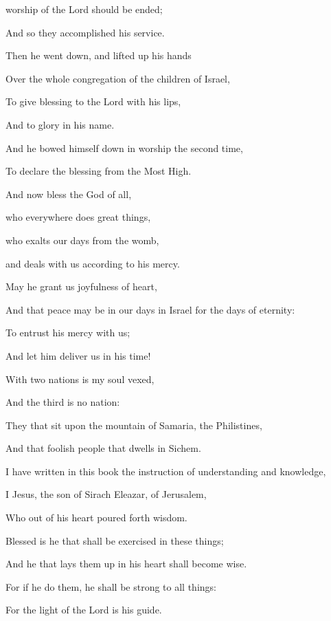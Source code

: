 { worship of the Lord should be ended;
\par }{\Q And so they accomplished his service.
\par }{\Q {}Then he went down, and lifted up his hands
\par }{\Q Over the whole congregation of the children of Israel,
\par }{\Q To give blessing to the Lord with his lips,
\par }{\Q And to glory in his name.
\par }{\Q {}And he bowed himself down in worship the second time,
\par }{\Q To declare the blessing from the Most High.
\par }{\BB \par }{\Q {}And now bless the God of all,
\par }{\QB who everywhere does great things,
\par }{\QB who exalts our days from the womb,
\par }{\QB and deals with us according to his mercy.
\par }{\Q {}May he grant us joyfulness of heart,
\par }{\Q And that peace may be in our days in Israel for the days of eternity:
\par }{\Q {}To entrust his mercy with us;
\par }{\Q And let him deliver us in his time!
\par }{\BB \par }{\Q {}With two nations is my soul vexed,
\par }{\Q And the third is no nation:
\par }{\Q {}They that sit upon the mountain of
 Samaria,
{} the Philistines,
\par }{\Q And that foolish people that dwells in Sichem.
\par }{\BB \par }{\Q {}I have
 written in this book the instruction of understanding and knowledge,
\par }{\Q I Jesus, the son of Sirach Eleazar, of Jerusalem,
\par }{\Q Who out of his heart poured forth wisdom.
\par }{\Q {}Blessed is he that shall be exercised in these things;
\par }{\Q And he that lays them up in his heart shall become wise.
\par }{\Q {}For if he do them, he shall be strong to all things:
\par }{\Q For the light of the Lord is his
 guide.

}
